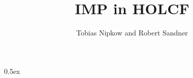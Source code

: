 \documentclass[11pt,a4paper]{article}
\begin{document}
\title{IMP in HOLCF}
\author{Tobias Nipkow and Robert Sandner}
\maketitle

\tableofcontents

\parindent 0pt\parskip 0.5ex




\end{document}
